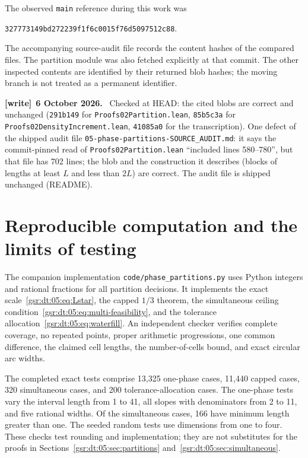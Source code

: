 \documentclass[11pt,letterpaper]{article}
\numberwithin{equation}{section}
\theoremstyle{definition}
\theoremstyle{remark}
\newcommand{\1}{\mathbf 1}
\newcommand{\file}[1]{\nolinkurl{#1}}
\newenvironment{writenote}[1][]{\par\smallskip\begingroup\small
 \noindent\textbf{[write]}\if\relax\detokenize{#1}\relax\else~\textbf{#1.}\fi\ }%
 {\par\endgroup\smallskip}
\newcommand{\srctag}[1]{\texorpdfstring{\enspace\textup{[#1]}}{ [#1]}}
\newcommand{\srcnote}[2]{\par\noindent{\small\textit{Source #1, delivered #2.}}\par}
\begin{document}
The observed \texttt{main} reference during this work was
\begin{center}
\texttt{327773149bd272239f1f6c0015f76d5097512c88}.
\end{center}
The accompanying source-audit file records the content hashes of the compared files. The partition module was also fetched explicitly at that commit. The other inspected contents are identified by their returned blob hashes; the moving branch is not treated as a permanent identifier.
\begin{writenote}[6 October 2026]
Checked at HEAD: the cited blobs are correct and unchanged (\texttt{291b149} for \file{Proofs02Partition.lean}, \texttt{85b5c3a} for \file{Proofs02DensityIncrement.lean}, \texttt{41085a0} for the transcription). One defect of the shipped audit file \file{05-phase-partitions-SOURCE\_AUDIT.md}: it says the commit-pinned read of \file{Proofs02Partition.lean} ``included lines 580--780'', but that file has 702 lines; the blob and the construction it describes (blocks of lengths at least $L$ and less than $2L$) are correct. The audit file is shipped unchanged (README).
\end{writenote}

\section[{Reproducible computation and the limits of testing\srctag{05}}]{Reproducible computation and the limits of testing}\label{gsr:fz:05:sec:d8}
\srcnote{05}{Section 8}
\label{gsr:fz:05:sec:tests}
The companion implementation \texttt{code/phase\_partitions.py} uses Python integers and rational fractions for all partition decisions. It implements the exact scale~\eqref{gsr:dt:05:eq:Lstar}, the capped $1/3$ theorem, the simultaneous ceiling condition~\eqref{gsr:dt:05:eq:multi-feasibility}, and the tolerance allocation~\eqref{gsr:dt:05:eq:waterfill}. An independent checker verifies complete coverage, no repeated points, proper arithmetic progressions, one common difference, the claimed cell lengths, the number-of-cells bound, and exact circular arc widths.

The completed exact tests comprise 13,325 one-phase cases, 11,440 capped cases, 320 simultaneous cases, and 200 tolerance-allocation cases. The one-phase tests vary the interval length from 1 to 41, all slopes with denominators from 2 to 11, and five rational widths. Of the simultaneous cases, 166 have minimum length greater than one. The seeded random tests use dimensions from one to four. These checks test rounding and implementation; they are not substitutes for the proofs in Sections~\ref{gsr:dt:05:sec:partitions} and~\ref{gsr:dt:05:sec:simultaneous}.
\end{document}
